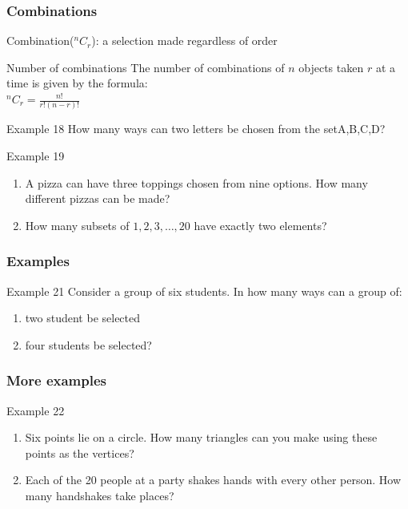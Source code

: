 \documentclass[
	11pt, %
]{beamer}
\begin{document}
\begin{frame}[t]
    \frametitle{Combinations}
    Combination($^nC_r$): a selection made regardless of order
    \begin{block}{Number of combinations}
        The number of combinations of $n$ objects taken $r$ at a time is given by the formula:\\
        $^nC_r = \frac{n!}{r!(n-r)!}$        
    \end{block}
    \begin{block}{Example 18}
        How many ways can two letters be chosen from the set{A,B,C,D}?
    \end{block}
    \begin{block}{Example 19}
        \begin{enumerate}
            \item A pizza can have three toppings chosen from nine options. How many different pizzas can be made?
            \item How many subsets of ${1,2,3,\dots,20}$ have exactly two elements?
        \end{enumerate}
    \end{block}
\end{frame}
\begin{frame}
\end{frame}

\begin{frame}[t]
    \frametitle{Examples}
    \begin{block}{Example 21}
        Consider a group of six students. In how many ways can a group of:\\
        \begin{enumerate}
            \item two student be selected
            \item four students be selected?
        \end{enumerate}
    \end{block}
\end{frame}

\begin{frame}[t]
    \frametitle{More examples}
    \begin{block}{Example 22}
        \begin{enumerate}
            \item Six points lie on a circle. How many triangles can you make using these points as the vertices?
            \item Each of the 20 people at a party shakes hands with every other person. How many handshakes take places?
        \end{enumerate}
    \end{block}
\end{frame}
\end{document}
